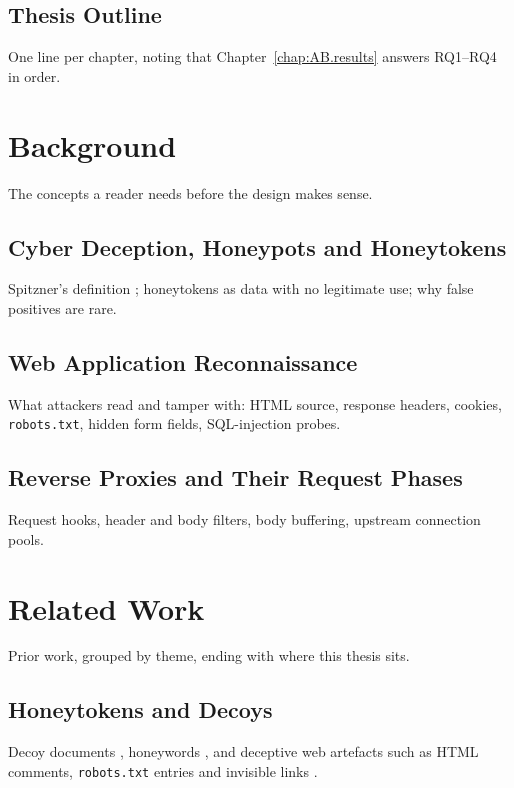 \documentclass{rptuma}
\begin{document}
\section{Thesis Outline}
One line per chapter, noting that Chapter~\ref{chap:AB.results} answers RQ1--RQ4 in order.

\chapter{Background}
The concepts a reader needs before the design makes sense.

\section{Cyber Deception, Honeypots and Honeytokens}
Spitzner's definition \cite{spitzner2002honeypots,spitzner2003honeytokens}; honeytokens as data with
no legitimate use; why false positives are rare.

\section{Web Application Reconnaissance}
What attackers read and tamper with: HTML source, response headers, cookies, \texttt{robots.txt},
hidden form fields, SQL-injection probes.

\section{Reverse Proxies and Their Request Phases}
Request hooks, header and body filters, body buffering, upstream connection pools.

\chapter{Related Work}
\label{chap:AB.related}
Prior work, grouped by theme, ending with where this thesis sits.

\section{Honeytokens and Decoys}
Decoy documents \cite{bowen2009baiting}, honeywords \cite{juels2013honeywords}, and deceptive web
artefacts such as HTML comments, \texttt{robots.txt} entries and invisible links
\cite{virvilis2014changing}.
\end{document}
